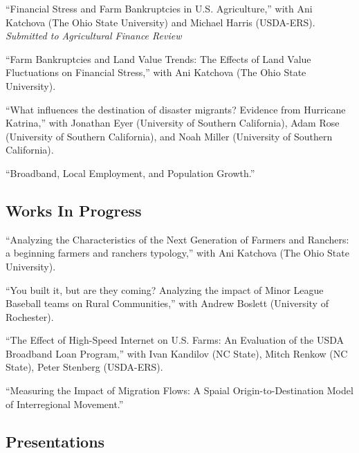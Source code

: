 \documentclass[letterpaper]{article}
\renewenvironment{itemize}{
  \begin{list}{}{
    \setlength{\leftmargin}{1.5em}
  }
}{
  \end{list}
}
\begin{document}
\begin{itemize}
\item ``Financial Stress and Farm Bankruptcies in U.S. Agriculture,'' with Ani Katchova (The Ohio State University) and Michael Harris (USDA-ERS). \emph{Submitted to Agricultural Finance Review}
\item ``Farm Bankruptcies and Land Value Trends: The Effects of Land Value Fluctuations on Financial Stress,'' with Ani Katchova (The Ohio State University).
\item ``What influences the destination of disaster migrants? Evidence from Hurricane Katrina,'' with Jonathan Eyer (University of Southern California), Adam Rose (University of Southern California), and Noah Miller (University of Southern California).
\item ``Broadband, Local Employment, and Population Growth.''
\end{itemize}

\subsection*{Works In Progress}

\begin{itemize}
\item ``Analyzing the Characteristics of the Next Generation of Farmers and Ranchers: a beginning farmers and ranchers typology,'' with Ani Katchova (The Ohio State University).
\item ``You built it, but are they coming? Analyzing the impact of Minor League Baseball teams on Rural Communities,'' with Andrew Boslett (University of Rochester).
\item ``The Effect of High-Speed Internet on U.S. Farms: An Evaluation of the USDA Broadband Loan Program,'' with Ivan Kandilov (NC State), Mitch Renkow (NC State), Peter Stenberg (USDA-ERS).
\item ``Measuring the Impact of Migration Flows: A Spaial Origin-to-Destination Model of Interregional Movement.''
\end{itemize}

\subsection*{Presentations}
\end{document}
